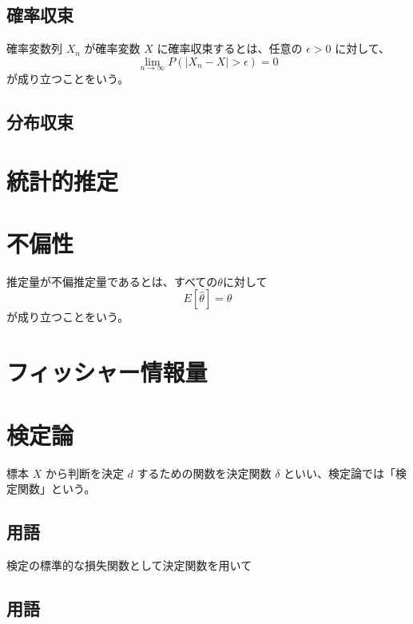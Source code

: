 \documentclass[10pt,a4paper]{ltjsarticle}
\begin{document}
\subsection{確率収束}

確率変数列 $X_n$ が確率変数 $X$ に確率収束するとは、任意の $\epsilon > 0$ に対して、
\begin{equation}
  \lim_{n\to\infty} P(|X_n - X|>\epsilon) = 0
\end{equation}
が成り立つことをいう。

\subsection{分布収束}

\section{統計的推定}

\section{不偏性}

推定量が不偏推定量であるとは、すべての$\theta$に対して
\begin{equation}
  E[\hat{\theta}] = \theta
\end{equation}
が成り立つことをいう。



\section{フィッシャー情報量}



\section{検定論}

標本 $X$ から判断を決定 $d$ するための関数を決定関数 $\delta$ といい、検定論では「検定関数」という。

\subsection{用語}

検定の標準的な損失関数として決定関数を用いて

\subsection{用語}
\end{document}
